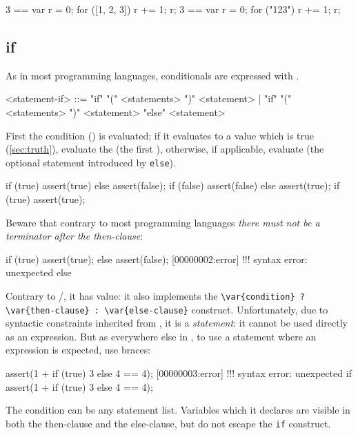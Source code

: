 \begin{urbiassert}
3 == { var r = 0; for ([1, 2, 3]) r += 1; r};
3 == { var r = 0; for ("123")     r += 1; r};
\end{urbiassert}


\subsection{if}
\label{sec:lang:if}
As in most programming languages, conditionals are expressed with
.

\begin{bnf}
<statement-if>
  ::= "if" "(" <statements> ")" <statement>
    | "if" "(" <statements> ")" <statement> "else" <statement>
\end{bnf}

First the condition () is evaluated; if it evaluates to a
value which is true (\autoref{sec:truth}), evaluate the 
(the first ), otherwise, if applicable, evaluate
 (the optional statement introduced by \lstinline|else|).

\begin{urbiscript}
if (true) assert(true) else assert(false);
if (false) assert(false) else assert(true);
if (true) assert(true);
\end{urbiscript}

Beware that contrary to most programming languages \emph{there must not be a
  terminator after the then-clause}:

\begin{urbiscript}
if (true)
  assert(true);
else
  assert(false);
[00000002:error] !!! syntax error: unexpected else
\end{urbiscript}

Contrary to \C/\Cxx, it has value: it also implements the
\lstinline|\var{condition} ? \var{then-clause} : \var{else-clause}|
construct.  Unfortunately, due to syntactic constraints inherited from \C,
it is a \emph{statement}: it cannot be used directly as an expression.  But
as everywhere else in \us, to use a statement where an expression is
expected, use braces:

\begin{urbiscript}
assert(1 + if (true) 3 else 4 == 4);
[00000003:error] !!! syntax error: unexpected if
assert(1 + { if (true) 3 else 4 } == 4);
\end{urbiscript}

The condition can be any statement list.  Variables which it declares are
visible in both the then-clause and the else-clause, but do not escape the
\lstinline|if| construct.

